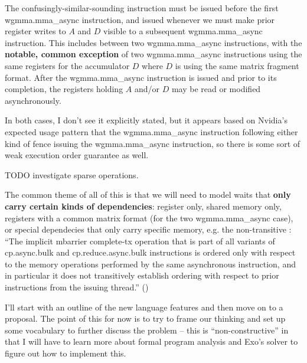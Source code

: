 \filbreak
{} The confusingly-similar-sounding  instruction must be issued before the first wgmma.mma\_async instruction, and issued whenever we must make prior register writes to $A$ and $D$ visible to a subsequent wgmma.mma\_async instruction. This includes between two wgmma.mma\_async instructions, with the \textbf{notable, common exception} of two wgmma.mma\_async instructions using the same registers for the accumulator $D$ where $D$ is using the same matrix fragment format. After the wgmma.mma\_async instruction is issued and prior to its completion, the registers holding $A$ and/or $D$ may be read or modified asynchronously.

\filbreak
In both cases, I don't see it explicitly stated, but it appears based on Nvidia's expected usage pattern that the wgmma.mma\_async instruction following either kind of fence  issuing the wgmma.mma\_async instruction, so there is some sort of weak execution order guarantee as well.

TODO investigate sparse operations.

\filbreak
{}

The common theme of all of this is that we will need to model waits that \textbf{only carry certain kinds of dependencies}: register only, shared memory only, registers with a common matrix format (for the two wgmma.mma\_async case), or special dependecies that only carry specific memory, e.g. the non-transitive \completeTxOperation: ``The implicit mbarrier complete-tx operation that is part of all variants of cp.async.bulk and cp.reduce.async.bulk instructions is ordered only with respect to the memory operations performed by the same asynchronous instruction, and in particular it does not transitively establish ordering with respect to prior instructions from the issuing thread.'' ()

\filbreak
{}

I'll start with an outline of the new language features and then move on to a proposal.
The point of this for now is to try to frame our thinking and set up some vocabulary to further discuss the problem -- this is ``non-constructive'' in that I will have to learn more about formal program analysis and Exo's solver to figure out how to implement this.


